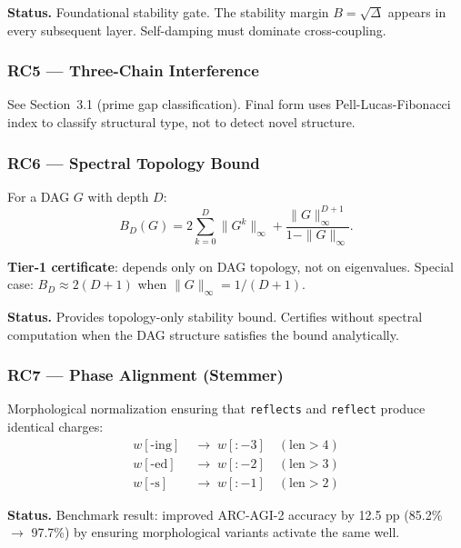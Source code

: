 \documentclass[11pt,twoside]{article}
\begin{document}
\begin{confirmedenv}
\textbf{Status.} Foundational stability gate. The stability margin $B = \sqrt{\Delta}$
appears in every subsequent layer. Self-damping must dominate cross-coupling.
\end{confirmedenv}

\subsubsection{RC5 --- Three-Chain Interference}

See Section~3.1 (prime gap classification). Final form uses Pell-Lucas-Fibonacci
index to classify structural type, not to detect novel structure.

\subsubsection{RC6 --- Spectral Topology Bound}

For a DAG $G$ with depth $D$:
\[
  B_D(G) = 2\sum_{k=0}^{D} \|G^k\|_\infty + \frac{\|G\|_\infty^{D+1}}{1 - \|G\|_\infty}.
\]

\textbf{Tier-1 certificate}: depends only on DAG topology, not on eigenvalues.
Special case: $B_D \approx 2(D+1)$ when $\|G\|_\infty = 1/(D+1)$.

\begin{confirmedenv}
\textbf{Status.} Provides topology-only stability bound. Certifies without spectral
computation when the DAG structure satisfies the bound analytically.
\end{confirmedenv}

\subsubsection{RC7 --- Phase Alignment (Stemmer)}

Morphological normalization ensuring that \texttt{reflects} and \texttt{reflect}
produce identical charges:
\begin{align*}
  w[\text{-ing}] \;&\to\; w[{:}{-3}] \quad (\text{len} > 4)\\
  w[\text{-ed}] \;&\to\; w[{:}{-2}] \quad (\text{len} > 3)\\
  w[\text{-s}] \;&\to\; w[{:}{-1}] \quad (\text{len} > 2)
\end{align*}

\begin{confirmedenv}
\textbf{Status.} Benchmark result: improved ARC-AGI-2 accuracy by 12.5 pp
(85.2\% $\to$ 97.7\%) by ensuring morphological variants activate the same well.
\end{confirmedenv}
\end{document}
